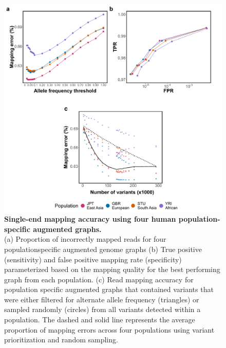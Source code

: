 \documentclass[../main.tex]{subfiles}
\begin{document}
\begin{flushleft}
\begin{figure}[!htb]
    \centering
    \includegraphics[width=\textwidth]{paper2/supplement/sp36.pdf}
    \caption[Single mapping accuracy using human graphs]{\textbf{Single-end mapping accuracy using four human population-specific
    augmented graphs. } \\
    \small{(a) Proportion of incorrectly mapped reads for four populationspecific augmented genome graphs (b) True positive (sensitivity) and false positive
    mapping rate (specificity) parameterized based on the mapping quality for the best
    performing graph from each population. (c) Read mapping accuracy for population specific augmented graphs that contained variants that were either filtered for
    alternate allele frequency (triangles) or sampled randomly (circles) from all variants detected within a population. The dashed and solid line represents the average proportion of mapping errors across four populations using variant prioritization and random sampling.}}
    \label{sup_fig:s36}
\end{figure}


\end{flushleft}
\end{document}
